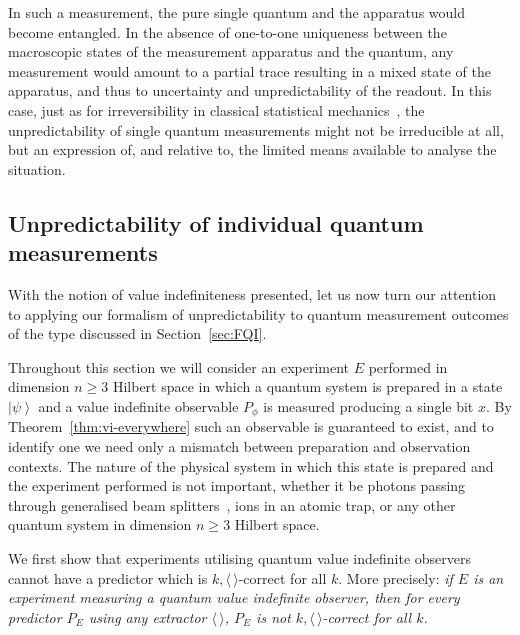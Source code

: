 \documentclass[%
 superscriptaddress,
 preprint,
 showpacs,
 showkeys,
 preprintnumbers,
  amsmath,amssymb,
  aps,
 pra,
  longbibliography,
  floatfix,
 ]{revtex4-1}
\theoremstyle{definition}
\newcommand{\ket}[1]{\left| #1 \right>}
\begin{document}
In such a measurement, the pure single quantum and the apparatus would become entangled.
In the absence of one-to-one uniqueness between the macroscopic states of the measurement apparatus and the quantum, any measurement would amount to a partial trace resulting in a mixed state of the apparatus, and thus to uncertainty and unpredictability of the readout.
In this case, just as for irreversibility in classical statistical mechanics~\cite{Myrvold2011237}, the unpredictability of single quantum measurements might not be irreducible at all, but  an expression of, and relative to, the limited means available to analyse the situation.



\subsection{Unpredictability of  individual quantum measurements}
\label{sec:physUnpred}


With the notion of value indefiniteness presented, let us now turn our attention to applying our formalism of unpredictability to quantum measurement outcomes of the type discussed in  Section~\ref{sec:FQI}.


Throughout this section we will consider an experiment $E$ performed in dimension $n\ge 3$ Hilbert space in which a quantum system is prepared in a state $\ket{\psi}$ and a value indefinite observable $P_\phi$ is measured producing a single bit $x$.
By Theorem~\ref{thm:vi-everywhere} such an observable is guaranteed to exist, and to identify one we need only a mismatch between preparation and observation contexts.
The nature of the physical system in which this state is prepared and the experiment performed is not important, whether it be photons passing through generalised beam splitters~\cite{rzbb},
ions in an atomic trap, or any other quantum system in dimension $n\ge 3$ Hilbert space.

We first show that experiments utilising quantum value indefinite observers cannot have a predictor which is $k,\langle \, \rangle$-correct for all $k$.
More precisely: {\em if $E$ is an experiment measuring  a quantum value indefinite observer, then for every predictor $P_E$ using any extractor $\langle\, \rangle$, $P_E$ is not $k,\langle \, \rangle$-correct for all $k$.}
\end{document}
